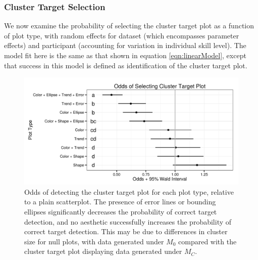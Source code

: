 \documentclass[11pt]{isuthesis}\usepackage[]{graphicx}\usepackage[]{color}
\newenvironment{knitrout}{}{} %
\begin{document}
\subsubsection{Cluster Target Selection}\label{sec:groupModel}


We now examine the probability of selecting the cluster target plot as a function of plot type, with random effects for dataset (which encompasses parameter effects) and participant (accounting for variation in individual skill level). The model fit here is the same as that shown in equation \eqref{eqn:linearModel}, except that success in this model is defined as identification of the cluster target plot. 

\begin{figure}[ht]\centering
\begin{knitrout}
\color{fgcolor}

{\centering \includegraphics[width=.75\linewidth]{Figure/FeatureHierarchy/fig-group-fixef-1} 

}



\end{knitrout}
\caption[Odds of detecting the cluster target plot for each  plot type]{Odds of detecting the cluster target plot for each  plot type, relative to a plain scatterplot. The presence of error lines or bounding ellipses significantly decreases the probability of correct target detection, and no aesthetic successfully increases the probability of correct target detection. This may be due to differences in cluster size for null plots, with data generated under $M_0$ compared with the cluster target plot displaying data generated under $M_C$. \label{fig:group.fixef}}
\end{figure}
\end{document}
